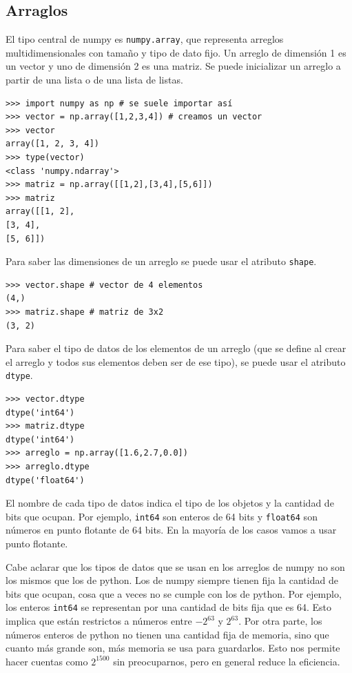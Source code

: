 \documentclass[a4paper, 12pt]{report}
\theoremstyle{definition}
\begin{document}
\subsection{Arraglos}

El tipo central  de numpy es {\tt numpy.array}, que representa arreglos multidimensionales con tamaño y tipo de dato fijo. Un arreglo de dimensión 1 es un vector y uno de dimensión 2 es una matriz. Se puede inicializar un arreglo a partir de una lista o de una lista de listas.
\begin{verbatim}
>>> import numpy as np # se suele importar así
>>> vector = np.array([1,2,3,4]) # creamos un vector
>>> vector
array([1, 2, 3, 4])
>>> type(vector)
<class 'numpy.ndarray'>
>>> matriz = np.array([[1,2],[3,4],[5,6]])
>>> matriz
array([[1, 2],
[3, 4],
[5, 6]])
\end{verbatim}
Para saber las dimensiones de un arreglo se puede usar el atributo {\tt shape}.
\begin{verbatim}
>>> vector.shape # vector de 4 elementos
(4,)
>>> matriz.shape # matriz de 3x2
(3, 2)
\end{verbatim}
Para saber el tipo de datos de los elementos de un arreglo (que se define al crear el arreglo y todos sus elementos deben ser de ese tipo), se  puede usar el atributo {\tt dtype}.
\begin{verbatim}
>>> vector.dtype
dtype('int64')
>>> matriz.dtype
dtype('int64')
>>> arreglo = np.array([1.6,2.7,0.0])
>>> arreglo.dtype
dtype('float64')
\end{verbatim}
El nombre de cada tipo de datos indica el tipo de los objetos y la cantidad de bits que ocupan. Por ejemplo, {\tt int64} son enteros de 64 bits y {\tt float64} son números en punto flotante de 64 bits. En la mayoría de los casos vamos a usar punto flotante.

Cabe aclarar que los tipos de datos que se usan en los arreglos de numpy no son los mismos que los de python. Los de numpy siempre tienen fija la cantidad de bits que ocupan, cosa que a veces no se cumple con los de python. Por ejemplo, los enteros {\tt int64} se representan por una cantidad de bits fija que es 64. Esto implica que están restrictos a números entre $-2^{63}$ y $2^{63}$. Por otra parte, los números enteros de python no tienen una cantidad fija de memoria, sino que cuanto más grande son, más memoria se usa para guardarlos. Esto nos permite hacer cuentas como $2^{1500}$ sin preocuparnos, pero en general reduce la eficiencia.
\end{document}

